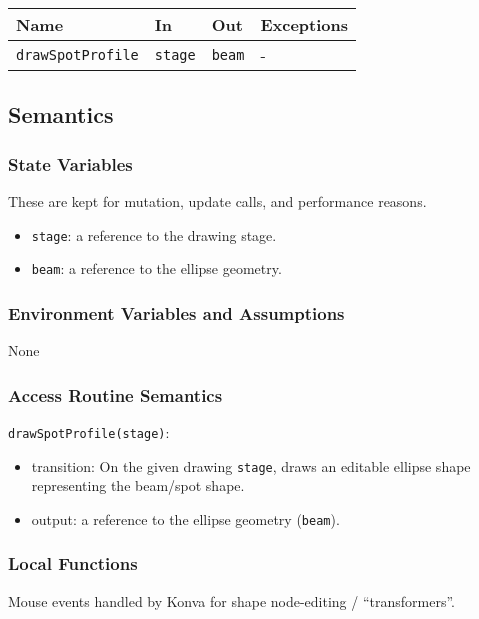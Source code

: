 \documentclass[12pt, titlepage]{article}
\newcommand{\code}[1]{\texttt{#1}}
\begin{document}
\begin{center}
\begin{tabular}{p{5cm} p{4cm} p{4cm} p{2cm}}
\hline
\textbf{Name} & \textbf{In} & \textbf{Out} & \textbf{Exceptions} \\
\hline
\code{drawSpotProfile} & \code{stage} & \code{beam} & - \\
\hline
\end{tabular}
\end{center}

\subsection{Semantics}

\subsubsection{State Variables}
These are kept for mutation, update calls, and performance reasons.
\begin{itemize}
  \item \code{stage}: a reference to the drawing stage.
  \item \code{beam}: a reference to the ellipse geometry.
\end{itemize}

\subsubsection{Environment Variables and Assumptions}
None

\subsubsection{Access Routine Semantics}

\noindent \code{drawSpotProfile(stage)}:
\begin{itemize}
\item transition: On the given drawing \code{stage},
  draws an editable ellipse shape representing the beam/spot shape.
\item output: a reference to the ellipse geometry (\code{beam}).
\end{itemize}

\subsubsection{Local Functions}
Mouse events handled by Konva for shape node-editing / ``transformers''.
\end{document}
